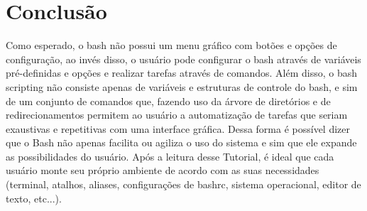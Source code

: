 \documentclass[oneside, 11 pt]{article}
\begin{document}
	\section{Conclusão}
	Como esperado, o bash não possui um menu gráfico com botões e opções de configuração, ao invés disso, o usuário pode configurar o bash através de variáveis pré-definidas e opções e realizar tarefas através de comandos. Além disso, o bash scripting não consiste apenas de variáveis e estruturas de controle do bash, e sim de um conjunto de comandos que, fazendo uso da árvore de diretórios e de redirecionamentos permitem ao usuário a automatização de tarefas que seriam exaustivas e repetitivas com uma interface gráfica. Dessa forma é possível dizer que o Bash não apenas facilita ou agiliza o uso do sistema e sim que ele expande as possibilidades do usuário. Após a leitura desse Tutorial, é ideal que cada usuário monte seu próprio ambiente de acordo com as suas necessidades (terminal, atalhos, aliases, configurações de bashrc, sistema operacional, editor de texto, etc...).
	
	



\end{document}
